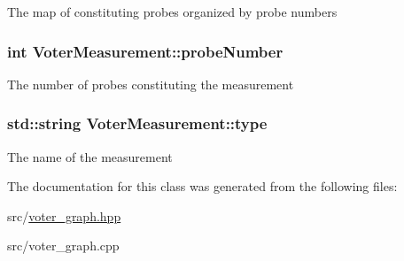 The map of constituting probes organized by probe numbers \hypertarget{classVoterMeasurement_a8cd0709289a4d1af82586d4b09c5a43a}{
\subsubsection[{probe\-Number}]{\setlength{\rightskip}{0pt plus 5cm}int Voter\-Measurement\-::probe\-Number}}\label{classVoterMeasurement_a8cd0709289a4d1af82586d4b09c5a43a}
The number of probes constituting the measurement \hypertarget{classVoterMeasurement_ad4471a133827f052622a84c4a451aabe}{
\subsubsection[{type}]{\setlength{\rightskip}{0pt plus 5cm}std\-::string Voter\-Measurement\-::type}}\label{classVoterMeasurement_ad4471a133827f052622a84c4a451aabe}
The name of the measurement 

The documentation for this class was generated from the following files\-:\begin{DoxyCompactItemize}
\item 
src/\hyperlink{voter__graph_8hpp}{voter\-\_\-graph.\-hpp}\item 
src/voter\-\_\-graph.\-cpp\end{DoxyCompactItemize}
